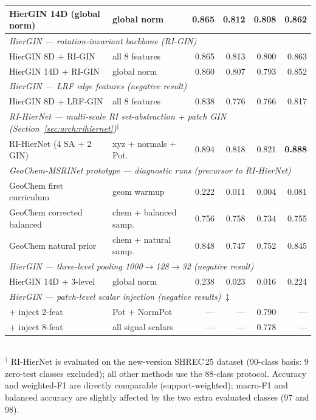 \begin{table}[ht]
\begin{tabular}{llrrrr}
    \quad HierGIN 14D (global norm)   & global norm          & 0.865 & 0.812 & \textbf{0.808} & 0.862 \\
    \midrule
    \multicolumn{6}{l}{\textit{HierGIN --- rotation-invariant backbone (RI-GIN)}} \\
    \quad HierGIN 8D + RI-GIN         & all 8 features       & 0.865 & 0.813 & 0.800 & 0.863 \\
    \quad HierGIN 14D + RI-GIN        & global norm          & 0.860 & 0.807 & 0.793 & 0.852 \\
    \midrule
    \multicolumn{6}{l}{\textit{HierGIN --- LRF edge features (negative result)}} \\
    \quad HierGIN 8D + LRF-GIN        & all 8 features       & 0.838 & 0.776 & 0.766 & 0.817 \\
    \midrule
    \multicolumn{6}{l}{\textit{RI-HierNet --- multi-scale RI set-abstraction + patch GIN (Section~\ref{sec:arch:rihiernet})$^\dagger$}} \\
    \quad RI-HierNet (4 SA + 2 GIN)   & xyz + normals + Pot. & 0.894 & 0.818 & 0.821 & \textbf{0.888} \\
    \midrule
    \multicolumn{6}{l}{\textit{GeoChem-MSRINet prototype --- diagnostic runs (precursor to RI-HierNet)}} \\
    \quad GeoChem first curriculum    & geom warmup          & 0.222 & 0.011 & 0.004 & 0.081 \\
    \quad GeoChem corrected balanced  & chem + balanced samp. & 0.756 & 0.758 & 0.734 & 0.755 \\
    \quad GeoChem natural prior       & chem + natural samp.  & 0.848 & 0.747 & 0.752 & 0.845 \\
    \midrule
    \multicolumn{6}{l}{\textit{HierGIN --- three-level pooling 1000$\to$128$\to$32 (negative result)}} \\
    \quad HierGIN 14D + 3-level       & global norm          & 0.238 & 0.023 & 0.016 & 0.224 \\
    \midrule
    \multicolumn{6}{l}{\textit{HierGIN --- patch-level scalar injection (negative results)$\;\ddagger$}} \\
    \quad + inject 2-feat             & Pot + NormPot        & ---   & ---   & 0.790 & ---   \\
    \quad + inject 8-feat             & all signal scalars   & ---   & ---   & 0.778 & ---   \\
    \bottomrule
  \end{tabular}
  \smallskip\\
  {\footnotesize $^\dagger$ RI-HierNet is evaluated on the new-version SHREC\,25 dataset
  (90-class basis: 9 zero-test classes excluded); all other methods use the
  88-class protocol.
  Accuracy and weighted-F1 are directly comparable (support-weighted);
  macro-F1 and balanced accuracy are slightly affected by the two extra
  evaluated classes (97 and 98).}
\end{table}

